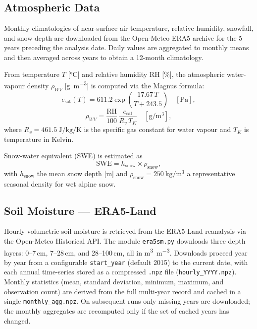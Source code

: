 \subsection{Atmospheric Data}

Monthly climatologies of near-surface air temperature, relative
humidity, snowfall, and snow depth are downloaded from the
Open-Meteo ERA5 archive \citep{hersbach2020} for the 5 years
preceding the analysis date.
Daily values are aggregated to monthly means and then averaged
across years to obtain a 12-month climatology.

From temperature $T$ [\si{\celsius}] and relative humidity
$\mathrm{RH}$ [\%], the atmospheric water-vapour density
$\rho_{WV}$ [\si{\gram\per\cubic\metre}] is computed via the
Magnus formula:
\begin{equation}
  e_\mathrm{sat}(T) = 611.2 \exp\!\left(\frac{17.67\,T}{T + 243.5}\right)
  \quad[\si{\pascal}],
  \label{eq:esat}
\end{equation}
\begin{equation}
  \rho_{WV} = \frac{\mathrm{RH}}{100}\,
              \frac{e_\mathrm{sat}}{R_v\,T_K}
  \quad[\si{\gram\per\cubic\metre}],
  \label{eq:rhoWV}
\end{equation}
where $R_v = \SI{461.5}{\joule\per\kilo\gram\per\kelvin}$ is the
specific gas constant for water vapour and $T_K$ is temperature
in Kelvin.

Snow-water equivalent (SWE) is estimated as
\begin{equation}
  \mathrm{SWE} = h_\mathrm{snow} \times \rho_\mathrm{snow},
  \label{eq:swe}
\end{equation}
with $h_\mathrm{snow}$ the mean snow depth [m] and
$\rho_\mathrm{snow} = \SI{250}{\kilo\gram\per\cubic\metre}$ a
representative seasonal density for wet alpine snow.

\subsection{Soil Moisture — ERA5-Land}
\label{sec:data:era5sm}

Hourly volumetric soil moisture is retrieved from the ERA5-Land
reanalysis via the Open-Meteo Historical API.
The module \texttt{era5sm.py} downloads three depth layers:
0--7\,cm, 7--28\,cm, and 28--100\,cm, all in
\si{\cubic\metre\per\cubic\metre}.
Downloads proceed year by year from a configurable
\texttt{start\_year} (default 2015) to the current date, with
each annual time-series stored as a compressed \texttt{.npz} file
(\texttt{hourly\_YYYY.npz}).
Monthly statistics (mean, standard deviation, minimum, maximum, and
observation count) are derived from the full multi-year record and
cached in a single \texttt{monthly\_agg.npz}.
On subsequent runs only missing years are downloaded; the monthly
aggregates are recomputed only if the set of cached years has
changed.

